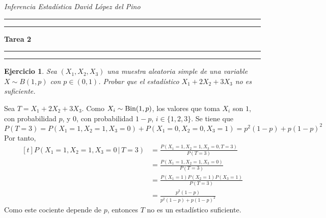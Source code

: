 \documentclass[11pt]{report}
\makeatletter
\renewenvironment{proof}[1][\proofname]{\par
  \pushQED{\qed}%
  \normalfont \topsep\z@skip %
  \trivlist
  \item[\hskip\labelsep
        \itshape
    #1\@addpunct{.}]\ignorespaces
}{%
  \popQED\endtrivlist\@endpefalse
}
\newtheorem{ejercicio}{Ejercicio}
\makeatother
\begin{document}


\textit{Inferencia Estadística} \hfill \textit{David López del Pino}

\vspace{-5mm}

\begin{center}

	\rule{\textwidth}{1.6pt}\vspace*{-\baselineskip}\vspace*{2pt} %
	\rule{\textwidth}{0.4pt} %
	
	{\LARGE \textbf{Tarea 2}} %
	
	\rule[0.66\baselineskip]{\textwidth}{0.4pt}\vspace*{-\baselineskip}\vspace{3.2pt} %
	\rule[0.66\baselineskip]{\textwidth}{1.6pt} %

\end{center}


\begin{ejercicio}
  Sea $(X_1,X_2,X_3)$ una muestra aleatoria simple de una variable $X \sim B(1,p)$ con $p \in (0,1)$. Probar que el estadístico $X_1+2X_2+3X_3$ no es suficiente.
\end{ejercicio}

\begin{proof}
  Sea $T = X_1+2X_2+3X_3$. Como $X_i \sim \textup{Bin}(1,p)$, los valores que toma $X_i$ son $1$, con probabilidad $p$, y $0$, con probabilidad $1-p$, $i \in \{1,2,3\}$. Se tiene que
  \[P(T=3) = P(X_1 = 1, X_2 = 1, X_3 = 0) + P(X_1=0,X_2=0,X_3=1) = p^2(1-p)+p(1-p)^2\]
  Por tanto,
  \[
  \begin{aligned}[t]
    P(X_1=1,X_2=1,X_3=0 \, | \, T = 3) &= \frac{P(X_1=1,X_2=1,X_3=0, T = 3)}{P(T=3)} \\ &=\frac{P(X_1=1,X_2=1,X_3=0)}{P(T=3)} \\ &=\frac{P(X_1=1)P(X_2=1)P(X_3=1)}{P(T=3)} 
    \\&= \frac{p^2(1-p)}{p^2(1-p)+p(1-p)^2}
  \end{aligned}  
  \]
  Como este cociente depende de $p$, entonces $T$ no es un estadístico suficiente.
\end{proof}
\end{document}
